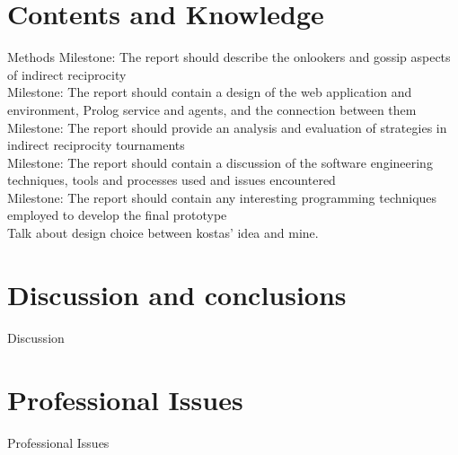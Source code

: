 \chapter{Contents and Knowledge}
Methods
Milestone: The report should describe the onlookers and gossip aspects of indirect reciprocity\\
Milestone: The report should contain a design of the web application and environment, Prolog service and agents, and the connection between them\\
Milestone: The report should provide an analysis and evaluation of strategies in indirect reciprocity tournaments\\
Milestone: The report should contain a discussion of the software engineering techniques, tools and processes used and issues encountered\\
Milestone: The report should contain any interesting programming techniques employed to develop the final prototype\\
Talk about design choice between kostas' idea and mine.%


\chapter{Discussion and conclusions}
Discussion

{}


\chapter*{Professional Issues}
Professional Issues


